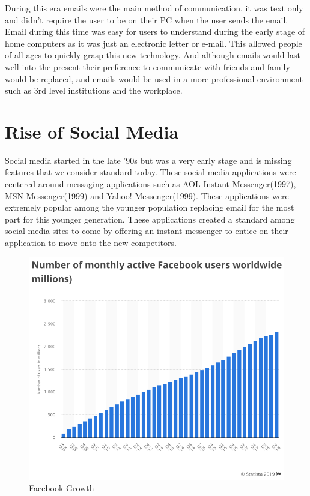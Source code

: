 During this era emails were the main method of communication, it was text only and didn't require the user to be on their PC when the user sends the email. Email during this time was easy for users to understand during the early stage of home computers as it was just an electronic letter or e-mail. This allowed people of all ages to quickly grasp this new technology. And although emails would last well into the present their preference to communicate with friends and family would be replaced, and emails would be used in a more professional environment such as 3rd level institutions and the workplace.

\section{Rise of Social Media}
Social media started in the late '90s but was a very early stage and is missing features that we consider standard today. These social media applications were centered around messaging applications such as AOL Instant Messenger(1997), MSN Messenger(1999) and Yahoo! Messenger(1999). These applications were extremely popular among the younger population replacing email for the most part for this younger generation. These applications created a standard among social media sites to come by offering an instant messenger to entice on their application to move onto the new competitors.

\begin{figure}[!htb]
  \includegraphics[width=\linewidth]{img/facebook-growth.png}
  \caption{Facebook Growth}
  \label{fig:FacebookG}
\end{figure}

